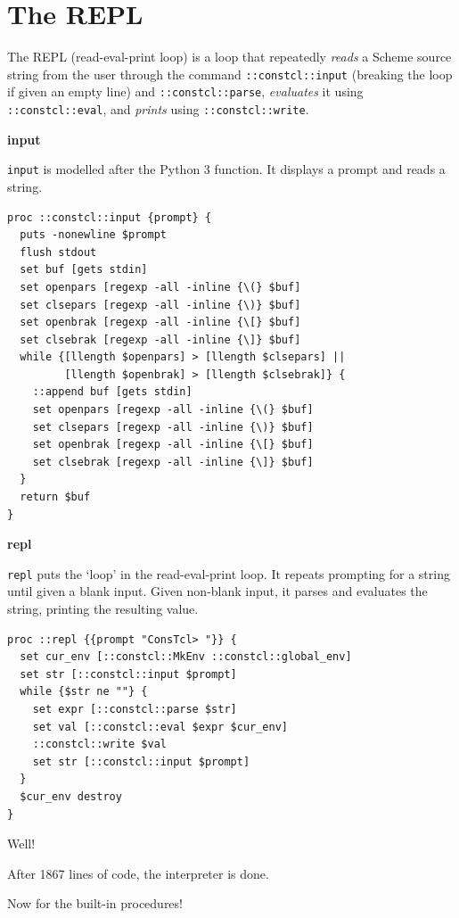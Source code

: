 \documentclass[twoside]{report}
\begin{document}
\chapter{The REPL}
\label{the-repl}

The REPL (read-eval-print loop) is a loop that repeatedly \emph{reads} a Scheme source string from the user through the command \texttt{::constcl::input} (breaking the loop if given an empty line) and \texttt{::constcl::parse}, \emph{evaluates} it using \texttt{::constcl::eval}, and \emph{prints} using \texttt{::constcl::write}.

\textbf{input}

\texttt{input} is modelled after the Python 3 function. It displays a prompt and reads a string.

\begin{lstlisting}
proc ::constcl::input {prompt} {
  puts -nonewline $prompt
  flush stdout
  set buf [gets stdin]
  set openpars [regexp -all -inline {\(} $buf]
  set clsepars [regexp -all -inline {\)} $buf]
  set openbrak [regexp -all -inline {\[} $buf]
  set clsebrak [regexp -all -inline {\]} $buf]
  while {[llength $openpars] > [llength $clsepars] ||
         [llength $openbrak] > [llength $clsebrak]} {
    ::append buf [gets stdin]
    set openpars [regexp -all -inline {\(} $buf]
    set clsepars [regexp -all -inline {\)} $buf]
    set openbrak [regexp -all -inline {\[} $buf]
    set clsebrak [regexp -all -inline {\]} $buf]
  }
  return $buf
}
\end{lstlisting}

\textbf{repl}

\texttt{repl} puts the `loop' in the read-eval-print loop. It repeats prompting for a string until given a blank input. Given non-blank input, it parses and evaluates the string, printing the resulting value.

\begin{lstlisting}
proc ::repl {{prompt "ConsTcl> "}} {
  set cur_env [::constcl::MkEnv ::constcl::global_env]
  set str [::constcl::input $prompt]
  while {$str ne ""} {
    set expr [::constcl::parse $str]
    set val [::constcl::eval $expr $cur_env]
    ::constcl::write $val
    set str [::constcl::input $prompt]
  }
  $cur_env destroy
}
\end{lstlisting}

Well!

After 1867 lines of code, the interpreter is done.

Now for the built-in procedures!
\end{document}
